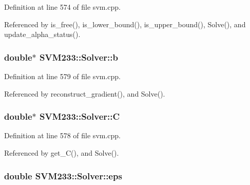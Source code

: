 Definition at line 574 of file svm.\+cpp.



Referenced by is\+\_\+free(), is\+\_\+lower\+\_\+bound(), is\+\_\+upper\+\_\+bound(), Solve(), and update\+\_\+alpha\+\_\+status().

\subsubsection[{\texorpdfstring{b}{b}}]{\setlength{\rightskip}{0pt plus 5cm}double$\ast$ S\+V\+M233\+::\+Solver\+::b\hspace{0.3cm}{\ttfamily [protected]}}\hypertarget{class_s_v_m233_1_1_solver_ae7665148726947abe81ad6e54fdfca14}{}\label{class_s_v_m233_1_1_solver_ae7665148726947abe81ad6e54fdfca14}


Definition at line 579 of file svm.\+cpp.



Referenced by reconstruct\+\_\+gradient(), and Solve().

\subsubsection[{\texorpdfstring{C}{C}}]{\setlength{\rightskip}{0pt plus 5cm}double$\ast$ S\+V\+M233\+::\+Solver\+::C\hspace{0.3cm}{\ttfamily [protected]}}\hypertarget{class_s_v_m233_1_1_solver_ab02bb338fce4d113399e8cfc66588dac}{}\label{class_s_v_m233_1_1_solver_ab02bb338fce4d113399e8cfc66588dac}


Definition at line 578 of file svm.\+cpp.



Referenced by get\+\_\+\+C(), and Solve().

\subsubsection[{\texorpdfstring{eps}{eps}}]{\setlength{\rightskip}{0pt plus 5cm}double S\+V\+M233\+::\+Solver\+::eps\hspace{0.3cm}{\ttfamily [protected]}}\hypertarget{class_s_v_m233_1_1_solver_a5332bb5b52696238e1a9e784e187a901}{}\label{class_s_v_m233_1_1_solver_a5332bb5b52696238e1a9e784e187a901}


